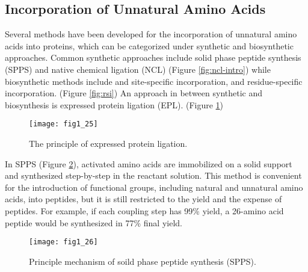 \begin{refsection}
\subsection{Incorporation of Unnatural Amino Acids} 
\label{sec:rsi-intro}

Several methods have been developed for the incorporation of unnatural amino
acids into proteins, which can be categorized under synthetic and biosynthetic
approaches. Common synthetic approaches include solid phase peptide synthesis
(SPPS) and native chemical ligation (NCL) (Figure
\ref{fig:ncl-intro}) while biosynthetic methods include  and
 site-specific incorporation\cite{Cellitti2008,Hassan2008}, and
residue-specific incorporation\cite{Johnson2010}. (Figure \ref{fig:rsi}) An
approach in between synthetic and biosynthesis is expressed protein ligation
(EPL)\cite{Muir1998}. (Figure \ref{fig:epl-intro})
\begin{figure}[h!] \centering \texttt{[image: fig1\_25]}
    \caption[The principle of expressed protein ligation.]{The principle of
        expressed protein ligation\cite{Muir1998}.} 
        \label{fig:epl-intro} 
\end{figure}

In SPPS  (Figure \ref{fig:spps-intro}), activated amino acids are
immobilized on a solid support and synthesized step-by-step in the reactant
solution. This method is convenient for the introduction of functional groups,
including natural and unnatural amino acids, into peptides, but it is still
restricted to the yield and the expense of peptides. For example, if each
coupling step has 99\% yield, a 26-amino acid peptide would be synthesized in
77\% final yield\cite{Chan2000}.  
\begin{figure}[h!] \centering \texttt{[image: fig1\_26]}
    \caption[Princilple mechanism of soild phase peptide synthesis
    (SPPS).]{Principle mechanism of soild phase peptide synthesis
        (SPPS)\cite{Merrifield1963a}.} \label{fig:spps-intro} 
\end{figure}


\end{refsection}
